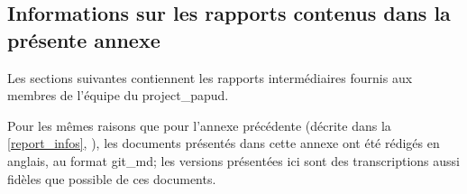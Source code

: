 

\begin{nohyphen}
\section{Informations sur les rapports contenus dans la présente annexe}
Les sections suivantes contiennent les rapports intermédiaires fournis aux membres de l'équipe du \gls{project_papud}.

Pour les mêmes raisons que pour l'annexe précédente (décrite dans la \autoref{report_infos}, ), les documents présentés dans cette annexe ont été rédigés en anglais, au format \gls{git_md}; les versions présentées ici sont des transcriptions aussi fidèles que possible de ces documents.

\end{nohyphen}

